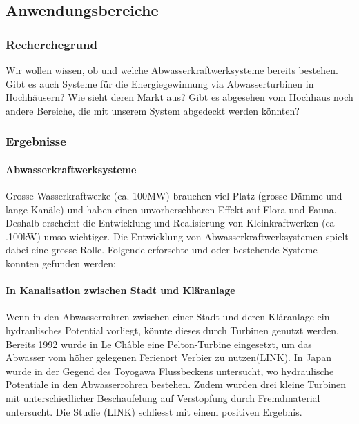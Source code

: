 \subsection{Anwendungsbereiche}
\subsubsection{Recherchegrund}
Wir wollen wissen, ob und welche Abwasserkraftwerksysteme bereits bestehen. Gibt es auch Systeme für die Energiegewinnung via Abwasserturbinen in Hochhäusern? Wie sieht deren Markt aus? Gibt es abgesehen vom Hochhaus noch andere Bereiche, die mit unserem System abgedeckt werden könnten?
\subsubsection{Ergebnisse}
\paragraph{Abwasserkraftwerksysteme}
Grosse Wasserkraftwerke (ca. 100\si{MW}) brauchen viel Platz (grosse Dämme und lange Kanäle) und haben einen unvorhersehbaren Effekt auf Flora und Fauna. Deshalb erscheint die Entwicklung und Realisierung von Kleinkraftwerken (ca .100\si{kW}) umso wichtiger. Die Entwicklung von Abwasserkraftwerksystemen spielt dabei eine grosse Rolle. Folgende erforschte und oder bestehende Systeme konnten gefunden werden:
\paragraph{In Kanalisation zwischen Stadt und Kläranlage}
Wenn in den Abwasserrohren zwischen einer Stadt und deren Kläranlage ein hydraulisches Potential vorliegt, könnte dieses durch Turbinen genutzt werden. Bereits 1992 wurde in Le Châble eine Pelton-Turbine eingesetzt, um das Abwasser vom höher gelegenen Ferienort Verbier zu nutzen(LINK). In Japan wurde in der Gegend des Toyogawa Flussbeckens untersucht, wo hydraulische Potentiale in den Abwasserrohren bestehen. Zudem wurden drei kleine Turbinen mit unterschiedlicher Beschaufelung auf Verstopfung durch Fremdmaterial untersucht. Die Studie (LINK) schliesst mit einem positiven Ergebnis.
